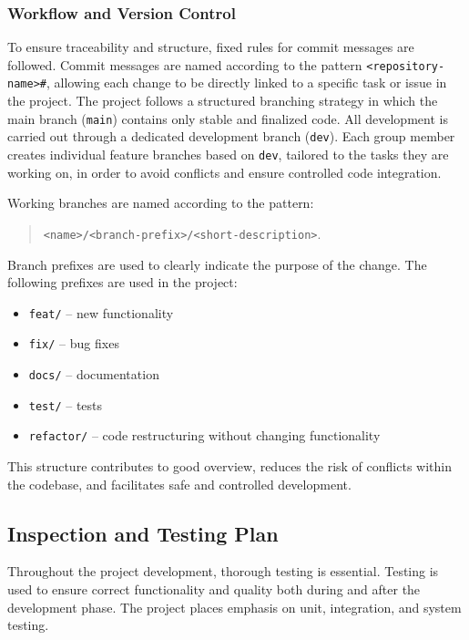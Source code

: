\subsubsection{Workflow and Version Control}

To ensure traceability and structure, fixed rules for commit messages are followed. Commit messages are named according to the pattern \texttt{<repository-name>\#<issue-number>}, allowing each change to be directly linked to a specific task or issue in the project. The project follows a structured branching strategy in which the main branch (\texttt{main}) contains only stable and finalized code. All development is carried out through a dedicated development branch (\texttt{dev}). Each group member creates individual feature branches based on \texttt{dev}, tailored to the tasks they are working on, in order to avoid conflicts and ensure controlled code integration.

Working branches are named according to the pattern:

\begin{quote}
\texttt{<name>/<branch-prefix>/<short-description>}.
\end{quote}

Branch prefixes are used to clearly indicate the purpose of the change. The following prefixes are used in the project:

\begin{itemize}
    \item \texttt{feat/} -- new functionality
    \item \texttt{fix/} -- bug fixes
    \item \texttt{docs/} -- documentation
    \item \texttt{test/} -- tests
    \item \texttt{refactor/} -- code restructuring without changing functionality
\end{itemize}

This structure contributes to good overview, reduces the risk of conflicts within the codebase, and facilitates safe and controlled development.

\subsection{Inspection and Testing Plan}

Throughout the project development, thorough testing is essential. Testing is used to ensure correct functionality and quality both during and after the development phase. The project places emphasis on unit, integration, and system testing.

